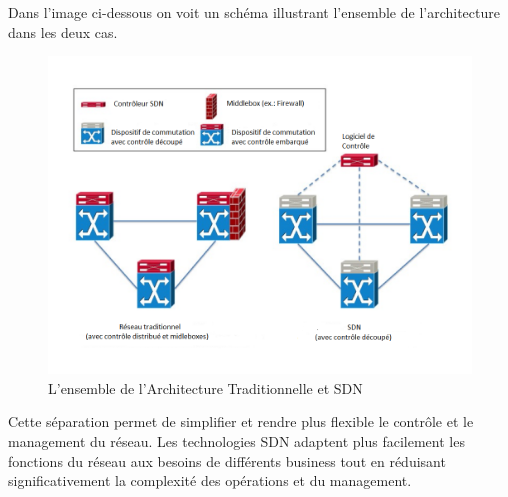 Dans l'image ci-dessous on voit un schéma illustrant l'ensemble de l'architecture dans les deux cas.




\begin{figure}[!h] %
\includegraphics[width=15cm]{images/TraditionalVsSDN.png} %
\caption{ L'ensemble de l'Architecture Traditionnelle et SDN \cite{SurveySDNArchi}} %
\label{imgOverviewArchi} %
\end{figure} %


Cette séparation permet de simplifier et rendre plus flexible le contrôle et le management du réseau. Les technologies SDN adaptent plus facilement les fonctions du réseau aux besoins de différents business tout en réduisant significativement la complexité des opérations et du management. \cite{sndChineseBookConceptsApplications}


